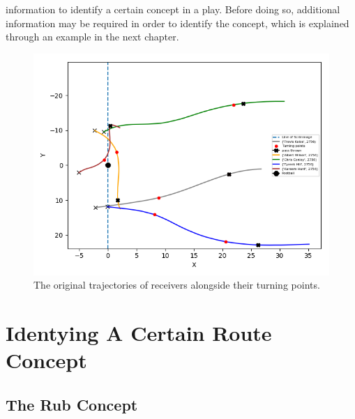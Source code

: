 \documentclass[12pt,oneside]{dukestatscithesis}
\theoremstyle{definition}
\theoremstyle{definition}
\theoremstyle{definition}
\theoremstyle{remark}
\begin{document}
information to identify a certain concept in a play. Before doing so,
additional information may be required in order to identify the concept,
which is explained through an example in the next chapter.
\begin{figure}
\includegraphics[width=8.89in,angle=360, scale=0.6]{figure/2756} \caption{The original trajectories of receivers alongside their turning points.}\label{fig:2756complex}
\end{figure}
\chapter{Identying A Certain Route Concept}\label{math}

\section{The Rub Concept}\label{the-rub-concept}
\end{document}

